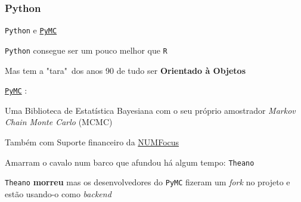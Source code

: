 \subsubsection{Python}
\begin{frame}{\texttt{Python} e \href{http://docs.pymc.io/}{\texttt{PyMC}}}
	\begin{vfilleditems}
		\item \texttt{Python} consegue ser um pouco melhor que \texttt{R}
		\item Mas tem a "tara"~dos anos 90 de tudo ser \textbf{Orientado à Objetos}
		\item \href{http://docs.pymc.io/}{\texttt{PyMC}} \parencite{pymc3}:
		\begin{vfilleditems}
			\item Uma Biblioteca de Estatística Bayesiana com o seu próprio amostrador \textit{Markov Chain Monte Carlo} (MCMC)
			\item Também com Suporte financeiro da \href{https://numfocus.org/}{NUMFocus}
			\item Amarram o cavalo num barco que afundou há algum tempo: \texttt{Theano}
			\item \texttt{Theano} \textbf{morreu} mas os desenvolvedores do \texttt{PyMC} fizeram um \textit{fork} no projeto e estão usando-o como \textit{backend}
		\end{vfilleditems}
	\end{vfilleditems}
\end{frame}



